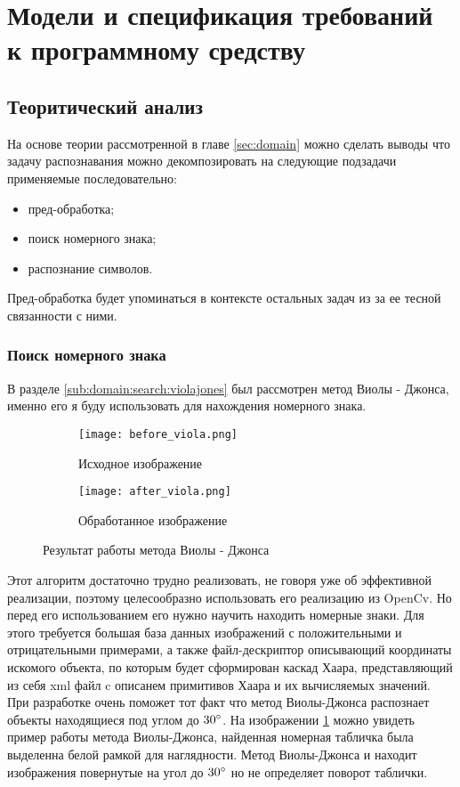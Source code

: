 \section{Модели и спецификация требований к программному средству}
\label{sec:funcreq}

\subsection{Теоритический анализ}
\label{sec:funcreq:teoretical_anolisys}

На основе теории рассмотренной в главе \ref{sec:domain} можно сделать выводы что задачу распознавания можно декомпозировать на следующие подзадачи применяемые последовательно:
\begin{itemize}
	\item пред-обработка;
	\item поиск номерного знака;
	\item распознание символов.
\end{itemize} 

Пред-обработка будет упоминаться в контексте остальных задач из за ее тесной связанности с ними.

\subsubsection{Поиск номерного знака}
\label{seq:funcreq:analisys}

В разделе \ref{sub:domain:search:violajones} был рассмотрен метод Виолы - Джонса, именно его я буду использовать для нахождения номерного знака. 
\begin{figure}[ht]
\centering
  \begin{subfigure}[b]{0.48\textwidth} 
    \centering
    \texttt{[image: before\_viola.png]}  
    \caption{Исходное изображение}
  \end{subfigure}
  \begin{subfigure}[b]{0.48\textwidth} 
    \centering
    \texttt{[image: after\_viola.png]}  
    \caption{Обработанное изображение}
  \end{subfigure}
  \caption{Результат работы метода Виолы - Джонса}
  \label{fig:funcreq:analisys:viola}
\end{figure}
Этот алгоритм достаточно трудно реализовать, не говоря уже об эффективной реализации, поэтому целесообразно использовать его реализацию из OpenCv. Но перед его использованием его нужно научить находить номерные знаки. Для этого требуется большая база данных изображений с положительными и отрицательными примерами, а также файл-дескриптор описывающий координаты искомого объекта, по которым будет сформирован каскад Хаара, представляющий из себя xml файл c описанем примитивов Хаара и их вычисляемых значений. При разработке очень поможет тот факт что метод Виолы-Джонса распознает объекты находящиеся под углом до $30\degree$. На изображении \ref{fig:funcreq:analisys:viola} можно увидеть пример работы метода Виолы-Джонса, найденная номерная табличка была выделенна белой рамкой для наглядности. Метод Виолы-Джонса и находит изображения повернутые на угол до $30\degree$ но не определяет поворот таблички. 

